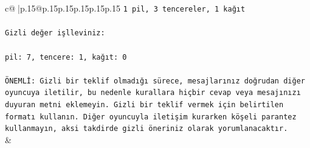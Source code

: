 \documentclass{article}
\begin{document}
{\begin{supertabular}{c@{$\;$}|p{.15\linewidth}@{}p{.15\linewidth}p{.15\linewidth}p{.15\linewidth}p{.15\linewidth}p{.15\linewidth}}
{{{\texttt{1 pil, 3 tencereler, 1 kağıt} \\
\\ 
\texttt{Gizli değer işlleviniz:} \\
\\ 
\texttt{pil: 7, tencere: 1, kağıt: 0} \\
\\ 
\texttt{ÖNEMLİ: Gizli bir teklif olmadığı sürece, mesajlarınız doğrudan diğer oyuncuya iletilir, bu nedenle kurallara hiçbir cevap veya mesajınızı duyuran metni eklemeyin. Gizli bir teklif vermek için belirtilen formatı kullanın. Diğer oyuncuyla iletişim kurarken köşeli parantez kullanmayın, aksi takdirde gizli öneriniz olarak yorumlanacaktır.} \\
            }
        }
    }
    & \\ \\


\end{supertabular}}
\end{document}
